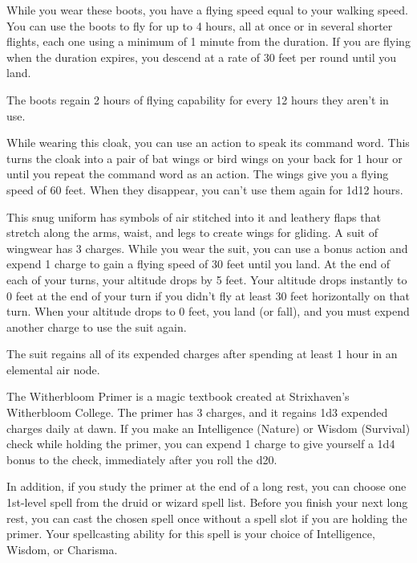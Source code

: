 \documentclass[10pt,a4paper,twoside,bg=print,twocolumn,openany,nodeprecatedcode]{dndbook}
\begin{document}
While you wear these boots, you have a flying speed equal to your walking speed. You can use the boots to fly for up to 4 hours, all at once or in several shorter flights, each one using a minimum of 1 minute from the duration. If you are flying when the duration expires, you descend at a rate of 30 feet per round until you land.

The boots regain 2 hours of flying capability for every 12 hours they aren't in use.

While wearing this cloak, you can use an action to speak its command word. This turns the cloak into a pair of bat wings or bird wings on your back for 1 hour or until you repeat the command word as an action. The wings give you a flying speed of 60 feet. When they disappear, you can't use them again for 1d12 hours.

This snug uniform has symbols of air stitched into it and leathery flaps that stretch along the arms, waist, and legs to create wings for gliding. A suit of wingwear has 3 charges. While you wear the suit, you can use a bonus action and expend 1 charge to gain a flying speed of 30 feet until you land. At the end of each of your turns, your altitude drops by 5 feet. Your altitude drops instantly to 0 feet at the end of your turn if you didn't fly at least 30 feet horizontally on that turn. When your altitude drops to 0 feet, you land (or fall), and you must expend another charge to use the suit again.

The suit regains all of its expended charges after spending at least 1 hour in an elemental air node.

The Witherbloom Primer is a magic textbook created at Strixhaven's Witherbloom College. The primer has 3 charges, and it regains 1d3 expended charges daily at dawn. If you make an Intelligence (Nature) or Wisdom (Survival) check while holding the primer, you can expend 1 charge to give yourself a 1d4 bonus to the check, immediately after you roll the d20.

In addition, if you study the primer at the end of a long rest, you can choose one 1st-level spell from the druid or wizard spell list. Before you finish your next long rest, you can cast the chosen spell once without a spell slot if you are holding the primer. Your spellcasting ability for this spell is your choice of Intelligence, Wisdom, or Charisma.
\end{document}
